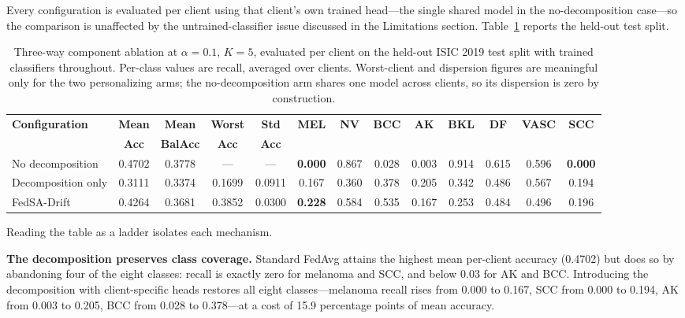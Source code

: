 \documentclass{ieeeaccess}
\newcommand{\sadrift}{FedSA-Drift}
\begin{document}
Every configuration is evaluated per client using that client's own trained head---the single shared model in the no-decomposition case---so the comparison is unaffected by the untrained-classifier issue discussed in the Limitations section. Table~\ref{tab:threeway} reports the held-out test split.

\begin{table}[t]
\centering
\caption[Three-way component ablation at alpha=0.1]{Three-way component ablation at $\alpha{=}0.1$, $K{=}5$, evaluated per client on the held-out ISIC 2019 test split with trained classifiers throughout. Per-class values are recall, averaged over clients. Worst-client and dispersion figures are meaningful only for the two personalizing arms; the no-decomposition arm shares one model across clients, so its dispersion is zero by construction.}
\label{tab:threeway}
\begin{tabular}{lcccc|cccccccc}
\hline
\textbf{Configuration} & \textbf{Mean} & \textbf{Mean} & \textbf{Worst} & \textbf{Std} & \textbf{MEL} & \textbf{NV} & \textbf{BCC} & \textbf{AK} & \textbf{BKL} & \textbf{DF} & \textbf{VASC} & \textbf{SCC} \\
 & \textbf{Acc} & \textbf{BalAcc} & \textbf{Acc} & \textbf{Acc} & & & & & & & & \\
\hline
No decomposition   & 0.4702 & 0.3778 & --- & --- & \textbf{0.000} & 0.867 & 0.028 & 0.003 & 0.914 & 0.615 & 0.596 & \textbf{0.000} \\
Decomposition only & 0.3111 & 0.3374 & 0.1699 & 0.0911 & 0.167 & 0.360 & 0.378 & 0.205 & 0.342 & 0.486 & 0.567 & 0.194 \\
\sadrift{}         & 0.4264 & 0.3681 & 0.3852 & 0.0300 & \textbf{0.228} & 0.584 & 0.535 & 0.167 & 0.253 & 0.484 & 0.496 & 0.196 \\
\hline
\end{tabular}
\end{table}

Reading the table as a ladder isolates each mechanism.

\textbf{The decomposition preserves class coverage.} Standard FedAvg attains the highest mean per-client accuracy (0.4702) but does so by abandoning four of the eight classes: recall is exactly zero for melanoma and SCC, and below 0.03 for AK and BCC. Introducing the decomposition with client-specific heads restores all eight classes---melanoma recall rises from 0.000 to 0.167, SCC from 0.000 to 0.194, AK from 0.003 to 0.205, BCC from 0.028 to 0.378---at a cost of 15.9 percentage points of mean accuracy.
\end{document}
